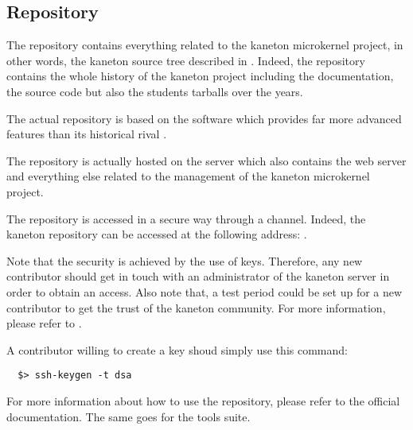 %
%
%
%
%
%

%
%

\subsection{Repository}
\label{section:repository}

The repository contains everything related to the kaneton microkernel
project, in other words, the kaneton source tree described in
. Indeed, the repository contains
the whole history of the kaneton project including the documentation, the
source code but also the students tarballs over the years.

The actual repository is based on the  software which
provides far more advanced features than its historical rival .

The repository is actually hosted on the  server which
also contains the web server and everything else related to the management
of the kaneton microkernel project.

The repository is accessed in a secure way through a  channel.
Indeed, the kaneton  repository can be accessed at the
following address:
.

Note that the security is achieved by the use of  keys. Therefore,
any new contributor should get in touch with an administrator of the
kaneton server in order to obtain an access. Also note that, a test period
could be set up for a new contributor to get the trust of the kaneton
community. For more information, please refer to .

A contributor willing to create a  key shoud simply use this
 command:

\begin{verbatim}
  $> ssh-keygen -t dsa
\end{verbatim}

For more information about how to use the repository, please refer to the
official  documentation. The same goes for the
 tools suite.

